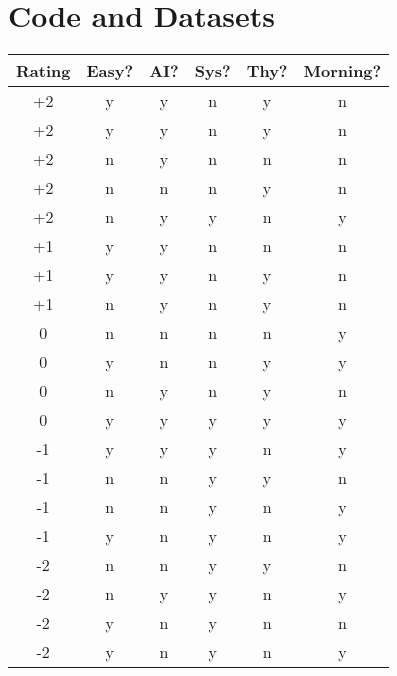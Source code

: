 
\chapter{Code and Datasets} \label{sec:data}


\begin{tabular}{c|ccccc}
{\bf Rating} &
{\bf Easy?} &
{\bf AI?} &
{\bf Sys?} &
{\bf Thy?} &
{\bf Morning?} \\
\hline
+2 & y  & y  & n  & y  & n  \\
+2 & y  & y  & n  & y  & n  \\
+2 & n  & y  & n  & n  & n  \\
+2 & n  & n  & n  & y  & n  \\
+2 & n  & y  & y  & n  & y  \\
+1 & y  & y  & n  & n  & n  \\
+1 & y  & y  & n  & y  & n  \\
+1 & n  & y  & n  & y  & n  \\
 0 & n  & n  & n  & n  & y  \\
 0 & y  & n  & n  & y  & y  \\
 0 & n  & y  & n  & y  & n  \\
 0 & y  & y  & y  & y  & y  \\
\hline
-1 & y  & y  & y  & n  & y  \\
-1 & n  & n  & y  & y  & n  \\
-1 & n  & n  & y  & n  & y  \\
-1 & y  & n  & y  & n  & y  \\
-2 & n  & n  & y  & y  & n  \\
-2 & n  & y  & y  & n  & y  \\
-2 & y  & n  & y  & n  & n  \\
-2 & y  & n  & y  & n  & y  \\
\end{tabular}

